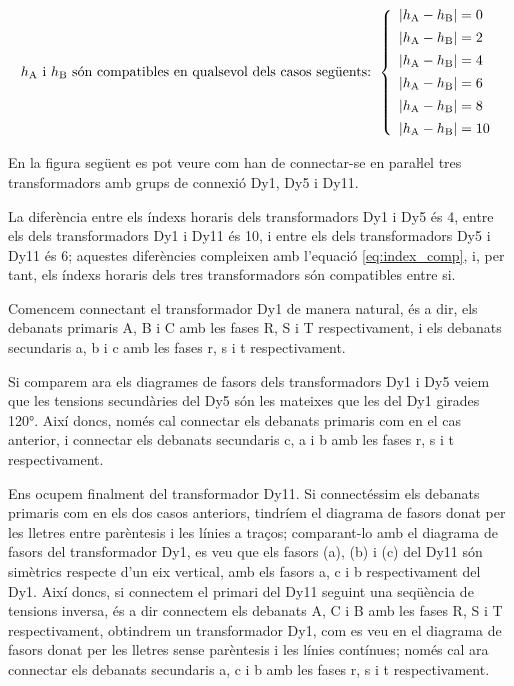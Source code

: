 \begin{equation}
    h_\mathrm{A} \text{ i } h_\mathrm{B} \text{ són compatibles en qualsevol dels casos següents: }
    \left\{
        \begin{array}{l}
           |h_\mathrm{A} - h_\mathrm{B}| = 0 \\[1ex]
           |h_\mathrm{A} - h_\mathrm{B}| = 2 \\[1ex]
           |h_\mathrm{A} - h_\mathrm{B}| = 4 \\[1ex]
           |h_\mathrm{A} - h_\mathrm{B}| = 6 \\[1ex]
           |h_\mathrm{A} - h_\mathrm{B}| = 8 \\[1ex]
           |h_\mathrm{A} - h_\mathrm{B}| = 10
        \end{array}
    \right.
    \label{eq:index_comp}
\end{equation}


	
\begin{exemple}[\ConnexParalDifIndex{}]
	\addcontentsxms{\ConnexParalDifIndex}
    En la figura següent es pot veure com han de connectar-se en paraŀlel tres transformadors amb grups de connexió Dy1, Dy5 i Dy11.

      La diferència entre els índexs horaris dels transformadors Dy1 i Dy5 és 4, entre els dels transformadors Dy1 i Dy11 és 10, i entre els dels transformadors Dy5 i Dy11 és 6; aquestes diferències compleixen amb l'equació \eqref{eq:index_comp}, i, per tant, els índexs horaris dels tres transformadors són compatibles entre si.


    Comencem connectant el  transformador Dy1 de manera natural, és a dir, els debanats primaris A, B i C amb les fases R, S i T respectivament, i els debanats secundaris a, b i c amb les fases r, s i t respectivament.

   \begin{center}
        
    \end{center}

    Si comparem ara els diagrames de fasors dels transformadors Dy1 i Dy5 veiem que les tensions secundàries del Dy5 són les mateixes que les del Dy1 girades \ang{120}. Així doncs, només  cal connectar els debanats primaris com en el cas anterior, i connectar els debanats secundaris c, a i b amb les fases r, s i t respectivament.


    Ens ocupem finalment del transformador Dy11. Si connectéssim els debanats primaris com en els dos casos anteriors, tindríem el diagrama de fasors donat per les lletres entre parèntesis i les línies a traços; comparant-lo amb el diagrama de fasors del transformador Dy1, es veu que els fasors (a), (b) i (c) del Dy11 són simètrics respecte d'un eix vertical, amb els fasors a, c i b respectivament del Dy1. Així doncs, si connectem el primari del Dy11 seguint una seqüència de tensions inversa, és a dir connectem els debanats A, C i B amb les fases R, S i T respectivament, obtindrem un transformador Dy1, com es veu en el diagrama de fasors donat per les lletres sense parèntesis i les línies contínues; només cal ara connectar els debanats secundaris a, c i b amb les fases r, s i t respectivament.
\end{exemple}

